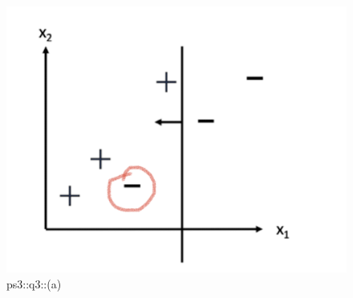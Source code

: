 \begin{answer}
\begin{figure}[H]
    \centering
    \includegraphics[width=0.5\linewidth]{Screenshot 2024-02-19 at 20.26.53.png}
    \caption{ps3::q3::(a)}
    \label{fig:enter-label}
\end{figure}
\end{answer}
